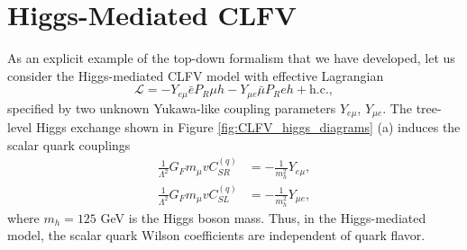 \documentclass{book}[letterpaper,12pt]
\begin{document}
\section{Higgs-Mediated CLFV}
\label{sec:CLFV_higgs}
As an explicit example of the top-down formalism that we have developed, let us consider the Higgs-mediated CLFV model with effective Lagrangian
\begin{equation}
\mathcal{L}=-Y_{e\mu}\bar{e}P_R\mu h-Y_{\mu e}\bar{\mu}P_Reh+\mathrm{h.c.},
\label{eq:L_higgs}
\end{equation}
specified by two unknown Yukawa-like coupling parameters $Y_{e\mu}$, $Y_{\mu e}$. The tree-level Higgs exchange shown in Figure \ref{fig:CLFV_higgs_diagrams} (a) induces the scalar quark couplings
\begin{equation}
\begin{split}
\frac{1}{\Lambda^2}G_Fm_{\mu}vC^{(q)}_{SR}&=-\frac{1}{m_h^2}Y_{e\mu},\\
\frac{1}{\Lambda^2}G_Fm_{\mu}vC_{SL}^{(q)}&=-\frac{1}{m_h^2}Y_{\mu e},
\end{split}
\end{equation}
where $m_h=125$ GeV is the Higgs boson mass. Thus, in the Higgs-mediated model, the scalar quark Wilson coefficients are independent of quark flavor. 
\end{document}
